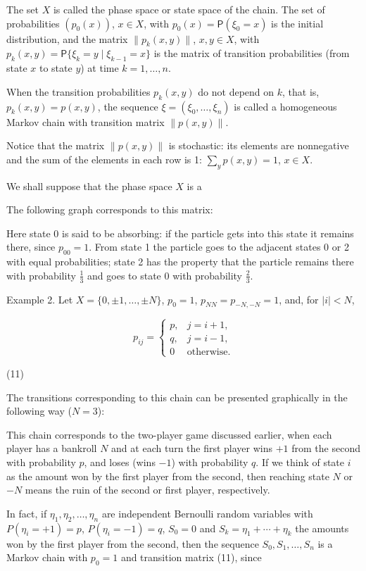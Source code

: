 The set $X$ is called the phase space or state space of the chain. The set of probabilities $(p_0(x))$, $x \in X$, with $p_0(x) = \mathsf{P}(\xi_0 = x)$ is the initial distribution, and the matrix $\|p_k(x,y)\|$, $x,y \in X$, with $p_k(x,y) = \mathsf{P}\{\xi_k = y \mid \xi_{k-1} = x\}$ is the matrix of transition probabilities (from state $x$ to state $y$) at time $k = 1, \ldots, n$.

When the transition probabilities $p_k(x,y)$ do not depend on $k$, that is, $p_k(x,y) = p(x,y)$, the sequence $\xi = (\xi_0, \ldots, \xi_n)$ is called a homogeneous Markov chain with transition matrix $\|p(x,y)\|$.

Notice that the matrix $\|p(x,y)\|$ is stochastic: its elements are nonnegative and the sum of the elements in each row is 1: $\sum_y p(x,y) = 1$, $x \in X$.

We shall suppose that the phase space $X$ is a

The following graph corresponds to this matrix:

Here state 0 is said to be absorbing: if the particle gets into this state it remains there, since $p_{00} = 1$. From state 1 the particle goes to the adjacent states 0 or 2 with equal probabilities; state 2 has the property that the particle remains there with probability $\frac{1}{3}$ and goes to state 0 with probability $\frac{2}{3}$.

Example 2. Let $X = \{0, \pm 1, \ldots, \pm N\}$, $p_0 = 1$, $p_{NN} = p_{-N,-N} = 1$, and, for $|i| < N$,

$$p_{ij} = \begin{cases} p, & j = i + 1, \\ q, & j = i - 1, \\ 0 & \text{otherwise.} \end{cases}$$

(11)

The transitions corresponding to this chain can be presented graphically in the following way ($N = 3$):

This chain corresponds to the two-player game discussed earlier, when each player has a bankroll $N$ and at each turn the first player wins $+1$ from the second with probability $p$, and loses (wins $-1$) with probability $q$. If we think of state $i$ as the amount won by the first player from the second, then reaching state $N$ or $-N$ means the ruin of the second or first player, respectively.

In fact, if $\eta_1, \eta_2, \ldots, \eta_n$ are independent Bernoulli random variables with $P(\eta_i = +1) = p$, $P(\eta_i = -1) = q$, $S_0 = 0$ and $S_k = \eta_1 + \cdots + \eta_k$ the amounts won by the first player from the second, then the sequence $S_0, S_1, \ldots, S_n$ is a Markov chain with $p_0 = 1$ and transition matrix (11), since

